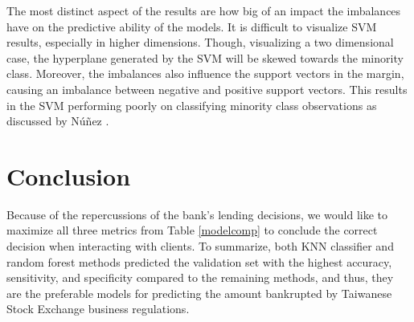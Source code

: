 \documentclass[12pt]{report}
\begin{document}
The most distinct aspect of the results are how big of an impact the imbalances have on the predictive ability of the models. It is difficult to visualize SVM results, especially in higher dimensions. Though, visualizing a two dimensional case, the hyperplane generated by the SVM will be skewed towards the minority class. Moreover, the imbalances also influence the support vectors in the margin, causing an imbalance between negative and positive support vectors. This results in the SVM performing poorly on classifying minority class observations as discussed by Núñez \cite{SVM}. 

\section{Conclusion}

Because of the repercussions of the bank's lending decisions, we would like to maximize all three metrics from Table \ref{modelcomp} to conclude the correct decision when interacting with clients. To summarize, both KNN classifier and random forest methods predicted the validation set with the highest accuracy, sensitivity, and specificity compared to the remaining methods, and thus, they are the preferable models for predicting the amount bankrupted by Taiwanese Stock Exchange business regulations.
\end{document}
